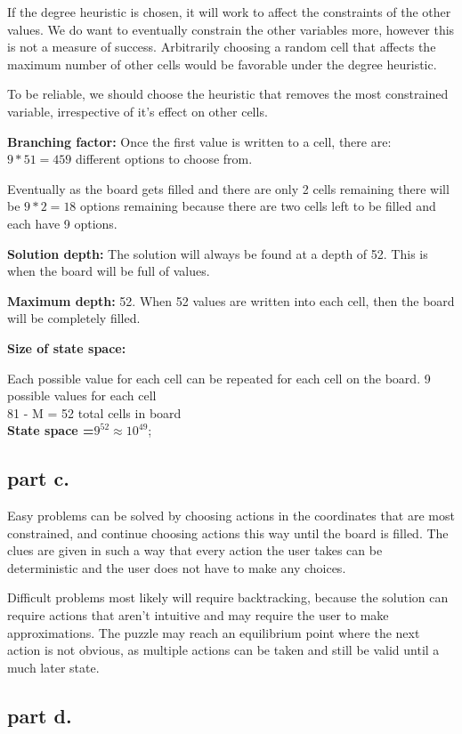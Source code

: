 If the degree heuristic is chosen, it will work to affect the constraints of the other values. We do want to eventually constrain the other variables more, however this is not a measure of success. Arbitrarily choosing a random cell that affects the maximum number of other cells would be favorable under the degree heuristic.

To be reliable, we should choose the heuristic that removes the most constrained variable, irrespective of it's effect on other cells.

\textbf{Branching factor:} 
Once the first value is written to a cell, there are: $9 * 51 = 459$ different options to choose from. 

Eventually as the board gets filled and there are only 2 cells remaining there will be $9 * 2 = 18$ options remaining because there are two cells left to be filled and each have 9 options.

\textbf{Solution depth:} 
The solution will always be found at a depth of 52. This is when the board will be full of values.

\textbf{Maximum depth:} 
52. When 52 values are written into each cell, then the board will be completely filled.

\textbf{Size of state space:}
 
Each possible value for each cell can be repeated for each cell on the board.
9 possible values for each cell \\
81 - M = 52 total cells in board \\
\textbf{State space =$9 ^ {52} \approx 10^{49}$};


\subsection{part c.}
Easy problems can be solved by choosing actions in the coordinates that are most constrained, and continue choosing actions this way until the board is filled. The clues are given in such a way that every action the user takes can be deterministic and the user does not have to make any choices.


Difficult problems most likely will require backtracking, because the solution can require actions that aren't intuitive and may require the user to make approximations. The puzzle may reach an equilibrium point where the next action is not obvious, as multiple actions can be taken and still be valid until a much later state.

\subsection{part d.}

